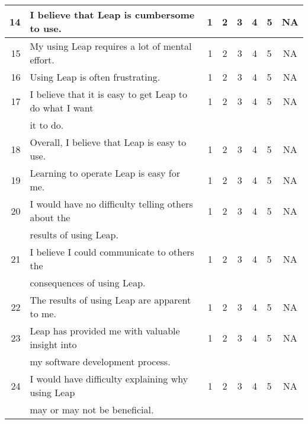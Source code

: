 \begin{table}[htbp]
\begin{tabular}{rlrccclc}
    14&I believe that Leap is cumbersome to use.&1&2&3&4&5&NA\\ \hline
    15&My using Leap requires a lot of mental effort.&1&2&3&4&5&NA\\ \hline
    16&Using Leap is often frustrating.&1&2&3&4&5&NA\\ \hline
    17&I believe that it is easy to get Leap to do what I want&1&2&3&4&5&NA\\
    &it to do. \\ \hline
    18&Overall, I believe that Leap is easy to use.&1&2&3&4&5&NA\\ \hline
    19&Learning to operate Leap is easy for me.&1&2&3&4&5&NA\\ \hline \hline
    20&I would have no difficulty telling others about the &1&2&3&4&5&NA \\
    &results of using Leap. \\ \hline
    21&I believe I could communicate to others the &1&2&3&4&5&NA \\
    &consequences of using Leap. \\ \hline
    22&The results of using Leap are apparent to me.&1&2&3&4&5&NA\\ \hline
    23&Leap has provided me with valuable insight into &1&2&3&4&5&NA\\
    & my software development process.\\ \hline 
    24&I would have difficulty explaining why using Leap &1&2&3&4&5&NA\\
    &may or may not be beneficial.\\ \hline \hline
    
  \end{tabular}
\end{table}
